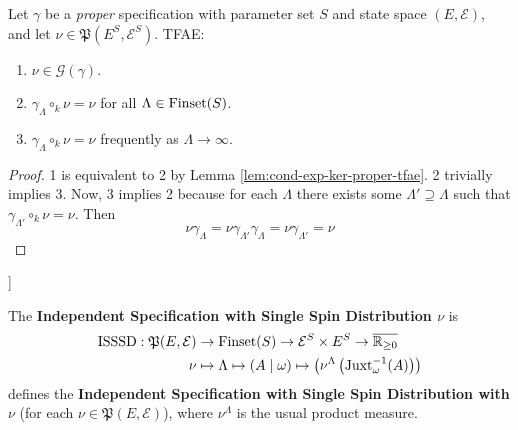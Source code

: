 \begin{lemma}
    \label{lem:gibbs-meas-tfae}
    \leanok

    Let $\gamma$ be a {\it proper} specification with parameter set $S$ and state space $(E, \mathcal{E})$, and let $\nu\in\mathfrak{P}(E^S, \mathcal{E}^S)$. TFAE:
    \begin{enumerate}
        \item $\nu\in\mathcal{G}(\gamma)$.
        \item $\gamma_\Lambda\circ_k\nu = \nu$ for all $\Lambda\in\operatorname{Finset}(S)$.
        \item $\gamma_\Lambda\circ_k\nu = \nu$ frequently as $\Lambda \to \infty$.
    \end{enumerate}
\end{lemma}
\begin{proof}
    \leanok

    1 is equivalent to 2 by Lemma \ref{lem:cond-exp-ker-proper-tfae}. 2 trivially implies 3. Now, 3 implies 2 because for each $\Lambda$ there exists some $\Lambda' \supseteq \Lambda$ such that
    $\gamma_{\Lambda'}\circ_k\nu = \nu$. Then
    $$\nu\gamma_\Lambda = \nu\gamma_{\Lambda'}\gamma_\Lambda = \nu\gamma_{\Lambda'} = \nu$$
\end{proof}

\begin{definition}[Independent Specification with Single Spin Distribution [ISSSD]]
    \label{def:ISSSD}

    The \textbf{Independent Specification with Single Spin Distribution $\nu$} is
    \begin{align}
        \operatorname{ISSSD}:\mathfrak{P}(E, \mathcal{E})&\to\operatorname{Finset}(S)\to\mathcal{E}^S\times E^S\to\overline{\mathbb{R}_{\geq0}}\\
        \nu&\mapsto\Lambda\mapsto(A\mid\omega)\mapsto\left(\nu^\Lambda\left(\operatorname{Juxt}_{\omega}^{-1}(A)\right)\right)
    \end{align}
    defines the \textbf{Independent Specification with Single Spin Distribution with $\nu$} (for each $\nu\in\mathfrak{P}(E, \mathcal{E})$), where $\nu^\Lambda$ is the usual product measure.
\end{definition}

